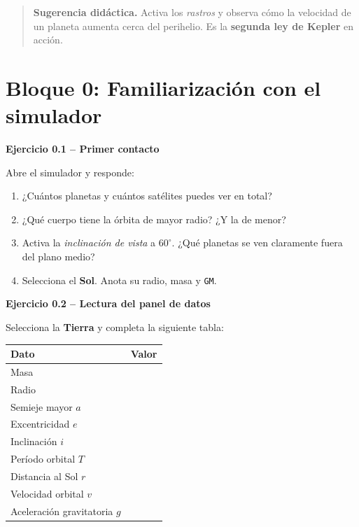 \documentclass[11pt,a4paper]{article}
\newenvironment{cajaImportante}{\begin{quote}\small}{\end{quote}}
\newenvironment{cajaEjercicio}[1][]{\par\medskip\noindent\textbf{#1}\par\smallskip}{\par\medskip}
\theoremstyle{definition}
\begin{document}
\begin{cajaImportante}
\textbf{Sugerencia didáctica.} Activa los \emph{rastros} y observa cómo la velocidad de un planeta aumenta cerca del perihelio. Es la \textbf{segunda ley de Kepler} en acción.
\end{cajaImportante}

\section{Bloque 0: Familiarización con el simulador}

\begin{cajaEjercicio}[Ejercicio 0.1 -- Primer contacto]
Abre el simulador y responde:
\begin{enumerate}[label=\alph*),leftmargin=*]
  \item ¿Cuántos planetas y cuántos satélites puedes ver en total?
  \item ¿Qué cuerpo tiene la órbita de mayor radio? ¿Y la de menor?
  \item Activa la \emph{inclinación de vista} a $60^{\circ}$. ¿Qué planetas se ven claramente fuera del plano medio?
  \item Selecciona el \textbf{Sol}. Anota su radio, masa y \texttt{GM}.
\end{enumerate}
\end{cajaEjercicio}

\begin{cajaEjercicio}[Ejercicio 0.2 -- Lectura del panel de datos]
Selecciona la \textbf{Tierra} y completa la siguiente tabla:

\begin{center}
\begin{tabular}{@{}lc@{}}
\toprule
\textbf{Dato} & \textbf{Valor} \\
\midrule
Masa & \hspace{4cm} \\
Radio & \\
Semieje mayor $a$ & \\
Excentricidad $e$ & \\
Inclinación $i$ & \\
Período orbital $T$ & \\
Distancia al Sol $r$ & \\
Velocidad orbital $v$ & \\
Aceleración gravitatoria $g$ & \\
\bottomrule
\end{tabular}
\end{center}
\end{cajaEjercicio}
\end{document}
